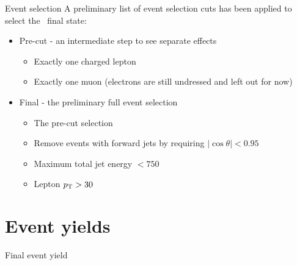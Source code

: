 \documentclass{beamer}
\newcommand{\texpath}{../analysis/tex/tex_full}
\begin{document}
\begin{frame}{Event selection}
A preliminary list of event selection cuts has been applied to select the \qqln\ final state:
\begin{itemize}
%
\item Pre-cut - an intermediate step to see separate effects
\begin{itemize}
\item Exactly one charged lepton
\item Exactly one muon (electrons are still undressed and left out for now)
\end{itemize}
%
\item Final - the preliminary full event selection
\begin{itemize}
\item The pre-cut selection
\item Remove events with forward jets by requiring $|\cos \theta| < 0.95$
\item Maximum total jet energy $< 750$~\GeV
\item Lepton $p_\mathrm{T} > 30$~\GeV
\end{itemize}
%
\end{itemize}
\end{frame}









\section{Event yields}


\begin{frame}{Final event yield}

\end{frame}























\end{document}
